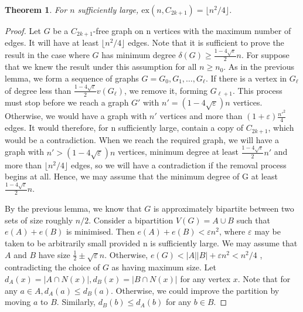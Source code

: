 \documentclass[12pt]{article}
\newtheorem{theorem}{Theorem}
\newcommand{\ex}{\mathrm{ex}}
\begin{document}
\begin{theorem}
	For $n$ sufficiently large, $\ex(n, C_{2k+1})=\lfloor n^2/4 \rfloor$.
\end{theorem}
\begin{proof}
	Let $G$ be a $C_{2k+1}$-free graph on n vertices with the maximum number of edges. It will have at least $\lfloor n^2/4 \rfloor$ edges. Note that it is sufficient to prove the result in the case where $G$ has minimum degree $\delta(G)\geq \frac{1-4\sqrt{\varepsilon}}{2}n$. For suppose that we knew the result under this assumption for all $n \geq n_0$. As in the previous lemma, we form a sequence of graphs $G=G_0, G_1, \dots, G_\ell$. If there is a vertex in $G_\ell$ of degree less than $\frac{1-4\sqrt{\varepsilon}}{2} v(G_\ell)$, we remove it, forming $G_{\ell+1}$. This process must stop before we reach a graph $G'$ with $n' = (1 - 4\sqrt{\varepsilon})n$ vertices. Otherwise, we would have a graph with $n'$ vertices and more than $(1+\varepsilon)\frac{n'^2}{4}$ edges. It would therefore, for n sufficiently large, contain a copy of $C_{2k+1}$, which would be a contradiction. When we reach the required graph, we will have a graph with $n' > (1 - 4\sqrt{\varepsilon})n$ vertices, minimum degree at least $\frac{1-4\sqrt{\varepsilon}}{2} n'$ and more than $\lfloor n^2/4 \rfloor$ edges, so we will have a contradiction if the removal process begins at all. Hence, we may assume that the minimum degree of G at least $\frac{1-4\sqrt{\varepsilon}}{2} n$.

	By the previous lemma, we know that $G$ is approximately bipartite between two sets of size roughly $n/2$. Consider a bipartition $V (G) = A\cup B$ such that $e(A)+e(B)$ is minimised. Then $e(A)+e(B) < \varepsilon n^2$, where $\varepsilon$ may be taken to be arbitrarily small provided n is sufficiently large. We may assume that $A$ and $B$ have size $\frac{1}{2}\pm \sqrt{\varepsilon}n$. Otherwise, $e(G) < |A||B| + \varepsilon n^2 < n^2/4$ , contradicting the choice of $G$ as having maximum size. Let $d_A(x)=|A\cap N(x)|, d_B(x)=|B\cap N(x)|$ for any vertex $x$. Note that for any $a\in A, d_A(a)\leq d_B(a)$. Otherwise, we could improve the partition by moving $a$ to $B$. Similarly, $d_B(b)\leq d_A(b)$ for any $b\in B$.


\end{proof}
\end{document}
